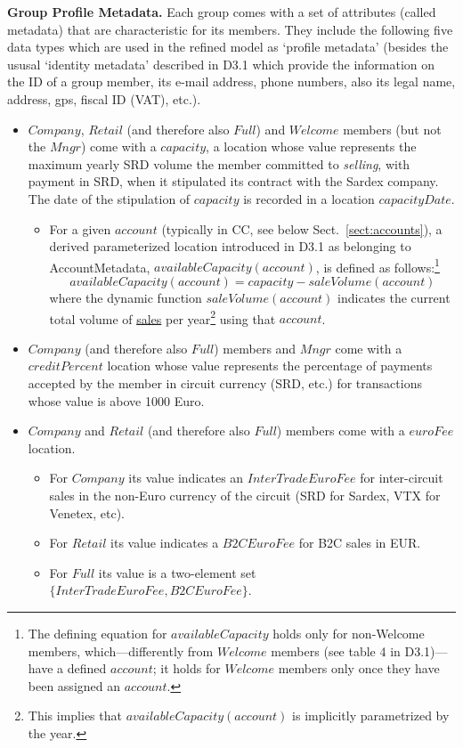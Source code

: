 {\bf Group Profile Metadata.} Each group comes with a set of attributes (called metadata) that are characteristic for its members. They include the following five data types which are used in the refined model as `profile metadata' (besides the ususal `identity metadata' described in D3.1 which provide the information on the ID of a group member, its e-mail address, phone numbers, also its legal name, address, gps, fiscal ID (VAT), etc.).
\begin{itemize}
	\item $Company$, $Retail$ (and therefore also $Full$) and $Welcome$ members (but not the $Mngr$) come with a $capacity$, a location whose value represents the maximum yearly SRD volume the member committed to \emph{selling}, with payment in SRD, when it stipulated its contract with the Sardex company. The date of the stipulation of $capacity$ is recorded in a location $capacityDate$.
	\begin{itemize}
		\item For a given $account$ (typically in CC, see below Sect.~\ref{sect:accounts}), a derived parameterized location introduced in D3.1 as belonging to AccountMetadata, $availableCapacity(account)$, is defined as follows:\footnote{The defining equation for $availableCapacity$ holds only for non-Welcome members, which---differently from $Welcome$ members (see table 4 in D3.1)--- have a defined $account$; it holds for $Welcome$ members only once they have been assigned an $account$.} 
		\[availableCapacity(account)=capacity-saleVolume(account)\]
		where the dynamic function $saleVolume(account)$ indicates the current total volume of \underline{sales} per year\footnote{This implies that $availableCapacity(account)$ is implicitly parametrized by the year.} using that $account$.
	\end{itemize}

\item $Company$ (and therefore also $Full$) members and $Mngr$ come with a $creditPercent$ location whose value represents the percentage of payments accepted by the member in circuit currency (SRD, etc.) for transactions whose value is above 1000 Euro.

\item $Company$ and $Retail$ (and therefore also $Full$) members come with a $euroFee$ location. 
	\begin{itemize}
	\item For $Company$ its value indicates an $InterTradeEuroFee$ for inter-circuit sales in the non-Euro currency of the circuit (SRD for Sardex, VTX for Venetex, etc).
	\item For $Retail$ its value indicates a $B2CEuroFee$ for B2C sales in EUR.
	\item For $Full$ its value is a two-element set $\{InterTradeEuroFee,B2CEuroFee\}$. 
	\end{itemize}


\end{itemize}

